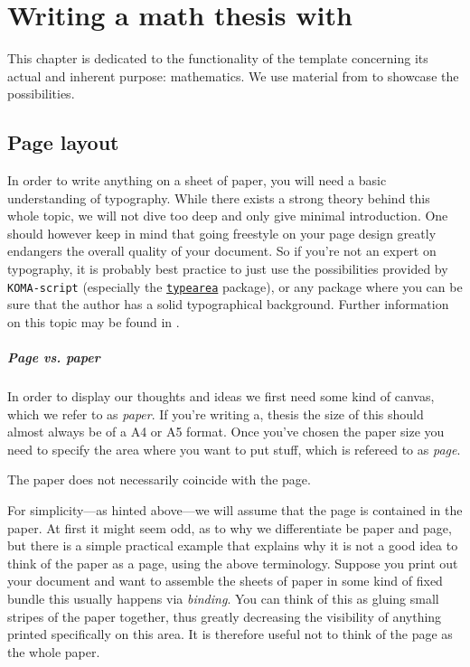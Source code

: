 \chapter{Writing a math thesis with \texttt{\classname}}\label{ch:math}
This chapter is dedicated to the functionality of the template concerning its actual and 
inherent purpose: mathematics. We use material from \cite{FineProp2015} to showcase 
the possibilities.
\section{Page layout}
In order to write anything on a sheet of paper, you will need a basic understanding 
of typography. While there exists a strong theory behind this whole topic, we will 
not dive too deep and only give minimal introduction. One should however keep in mind that 
going freestyle on your page design greatly endangers the overall quality of your document. 
So if you're not an expert on typography, it is probably best practice to just use the 
possibilities provided by \texttt{KOMA-script} 
(especially the \href{https://ctan.org/pkg/enumitem}{\texttt{typearea}} package), 
or any package where you can be sure that 
the author has a solid typographical background. Further information on this topic may be 
found in \cite{Tschichold75, Willberg99}.
\paragraph{Page vs. paper}
In order to display our thoughts and ideas we first need some kind of canvas, which we
refer to as \textit{paper}. If you're writing a, thesis the size of this 
should almost always be of a A4 or A5 format. Once you've chosen the paper size you 
need to specify the area where you want to put stuff, which is refereed to as \textit{page}.
\begin{emphBox}
The paper does not necessarily coincide with the page.
\end{emphBox}
For simplicity---as hinted above---we will assume that the page is contained in the paper. 
At first it might seem odd, as to why we differentiate be paper and page, but there is a 
simple practical example that explains why it is not a good idea to think of the paper as 
a page, using the above terminology. Suppose you print 
out your document and want to assemble the sheets of paper in some kind of fixed bundle 
this usually happens via \textit{binding}. You can think of this as gluing small stripes 
of the paper together, thus greatly decreasing the visibility of anything printed 
specifically on this area. It is therefore useful not to think of the page as the whole paper.
\par
